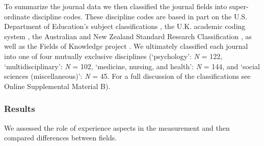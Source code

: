 To summarize the journal data we then classified the journal fields into
super-ordinate discipline codes. These discipline codes are based in
part on the U.S. Department of Education's subject classifications
\citep[i.e., CIP,][]{InstituteofEducationSciences2020}, the U.K.
academic coding system
\citep[JACS 3.0,][]{HigherEducationStatisticsAgency2013}, the Australian
and New Zealand Standard Research Classification
\citep[ANZSRC 2020,][]{AustralianBureauofStatistics2020}, as well as the
Fields of Knowledge project \citep{ThingsmadeThinkable2014}. We
ultimately classified each journal into one of four mutually exclusive
disciplines (`psychology': \textit{N} = 122, `multidisciplinary':
\textit{N} = 102, `medicine, nursing, and health': \textit{N} = 144, and
`social sciences (miscellaneous)': \textit{N} = 45. For a full
discussion of the classifications see Online Supplemental Material B).

\subsubsection{Results}

We assessed the role of experience aspects in the measurement and then
compared differences between fields.


